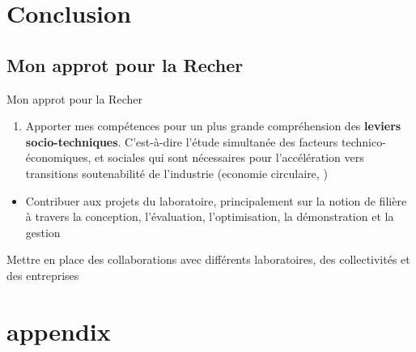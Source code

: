 \documentclass[
  11pt,
  ignorenonframetext,
  aspectratio=169,
  c]{beamer}
\providecommand{\tightlist}{%
  \setlength{\itemsep}{0pt}\setlength{\parskip}{0pt}}\usepackage{longtable,booktabs,array}
\begin{document}
\hypertarget{conclusion}{%
\section{Conclusion}\label{conclusion}}

\hypertarget{mon-approt-pour-la-recher}{%
\subsection{Mon approt pour la Recher}\label{mon-approt-pour-la-recher}}

\begin{frame}{Mon approt pour la Recher}
\begin{enumerate}
\tightlist
\item
  Apporter mes compétences pour un plus grande compréhension des
  \textbf{leviers socio-techniques}. C'est-à-dire l'étude simultanée des
  facteurs technico-économiques, et sociales qui sont nécessaires pour
  l'accélération vers transitions soutenabilité de l'industrie (economie
  circulaire, )
\end{enumerate}

\begin{itemize}
\tightlist
\item
  Contribuer aux projets du laboratoire, principalement sur la notion de
  filière à travers la conception, l'évaluation, l'optimisation, la
  démonstration et la gestion
\end{itemize}

Mettre en place des collaborations avec différents laboratoires, des
collectivités et des entreprises

\appendix
\end{frame}

\hypertarget{appendix}{%
\section{appendix}\label{appendix}}
\end{document}
